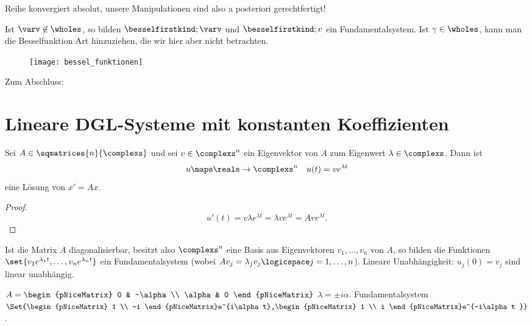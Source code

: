 Reihe konvergiert absolut, unsere Manipulationen sind also a posteriori gerechtfertigt!

Ist \( \varv\not\in \wholes \), so bilden \( \besselfirstkind;{\varv} \) und \( \besselfirstkind;{v} \) ein Fundamentalsystem. Ist \( \gamma\in \wholes \), kann man \zb die Besselfunktion  Art hinzuziehen, die wir hier aber nicht betrachten.
\begin{figure}[H]
  \centering
  \texttt{[image: bessel\_funktionen]}
  \label{fig:bessel_funktionen}
\end{figure}
Zum Abschluss:
\section{Lineare DGL-Systeme mit konstanten Koeffizienten}
\begin{lemma}\label{eigenwert_von_konstanter_matrix_dgl_liefert_exp_loesung}
  Sei \( A\in \sqmatrices{n}{\complexs} \) und sei \( v\in \complexs^n \) ein Eigenvektor von \( A \) zum Eigenwert \( \lambda\in \complexs \). Dann ist
  \begin{equation*}
    u\maps \reals\to \complexs^n\quad u(t)=ve^{\lambda t}
  \end{equation*}
  eine Lösung von \( x'=Ax \).
\end{lemma}
\begin{proof}
  \begin{equation*}
    u'(t)=v\lambda e^{\lambda t}=\lambda v e^{\lambda t}=A v e^{\lambda t}.
  \end{equation*}
  
\end{proof}
\begin{folgerung*}
  Ist die Matrix \( A \) diagonalisierbar, besitzt also \( \complexs^n \) eine Basis aus Eigenvektoren \( v_1,\dotsc,v_n \) von \( A \), so bilden die Funktionen \( \set{v_1 e^{\lambda_1 t},\dotsc, v_n e^{\lambda_n t}} \) ein Fundamentalsystem (wobei \( Av_j=\lambda_j v_j \logicspace j=1,\dotsc,n\)). Lineare Unabhängigkeit: \( u_j(0)=v_j \) sind linear unabhängig.
\end{folgerung*}
\begin{beispiel*}
  \( A=\begin{pNiceMatrix} 0 & -\alpha \\ \alpha & 0 \end{pNiceMatrix} \) \timplies \( \lambda=\pm i\alpha \). Fundamentalsystem \( \Set{\begin{pNiceMatrix} 1 \\ -i \end{pNiceMatrix}e^{i\alpha t},\begin{pNiceMatrix} 1 \\ i \end{pNiceMatrix}e^{-i\alpha t }} \).
\end{beispiel*}
